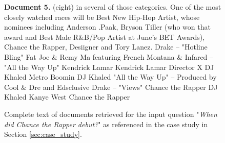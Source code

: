 \begin{figure*}[ht!]
\begin{tcolorbox}[boxrule=0pt]
  \textbf{Document 5.} (eight) in several of those categories. One of the most closely watched races will be Best New Hip-Hop Artist, whose nominees including Anderson .Paak, Bryson Tiller (who won that award and Best Male R\&B/Pop Artist at June’s BET Awards), Chance the Rapper, Desiigner and Tory Lanez.  Drake – "Hotline Bling" Fat Joe \& Remy Ma featuring French Montana \& Infared – "All the Way Up" Kendrick Lamar Kendrick Lamar Director X DJ Khaled Metro Boomin DJ Khaled "All the Way Up" – Produced by Cool \& Dre and Edsclusive  Drake – "Views" Chance the Rapper DJ Khaled Kanye West Chance the Rapper

\end{tcolorbox}

\vspace{-3mm}


\caption{Complete text of documents retrieved for the input question "\textit{When did Chance the Rapper debut?}" as referenced in the case study in Section \ref{sec:case_study}.}


\label{fig:full_documents}
\end{figure*}
